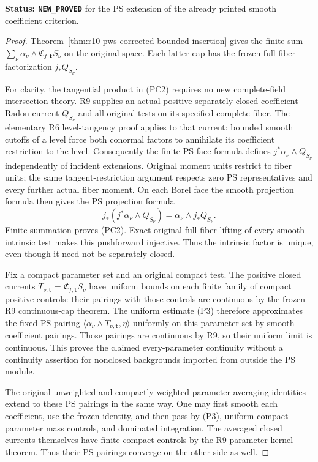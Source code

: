 \noindent\textbf{Status: \texttt{NEW\_PROVED}} for the PS
extension of the already printed smooth coefficient criterion.

\begin{proof}
Theorem~\ref{thm:r10-pws-corrected-bounded-insertion} gives
the finite sum $\sum_\nu\alpha_\nu\wedge
\mathfrak C_{f,\mathbf t}S_\nu$ on the original space.
Each latter cap has the frozen full-fiber factorization
$j_*Q_{S_\nu}$.

For clarity, the tangential product in (PC2) requires no new
complete-field intersection theory.  R9 supplies an actual
positive separately closed coefficient-Radon current $Q_{S_\nu}$
and all original tests on its specified complete fiber.
The elementary R6 level-tangency proof applies to that current:
bounded smooth cutoffs of a level force both conormal factors
to annihilate its coefficient restriction to the level.
Consequently the finite PS face formula defines
$j^*\alpha_\nu\wedge Q_{S_\nu}$ independently of incident
extensions.  Original moment units restrict to fiber units;
the same tangent-restriction argument respects zero PS
representatives and every further actual fiber moment.
On each Borel face the smooth projection formula then gives
the PS projection formula
\[
 j_*(j^*\alpha_\nu\wedge Q_{S_\nu})
                        =\alpha_\nu\wedge j_*Q_{S_\nu}.
\]
Finite summation proves (PC2).  Exact original full-fiber
lifting of every smooth intrinsic test makes this pushforward
injective.  Thus the intrinsic factor is unique, even though
it need not be separately closed.

Fix a compact parameter set and an original compact test.
The positive closed currents
$T_{\nu,\mathbf t}=\mathfrak C_{f,\mathbf t}S_\nu$ have
uniform bounds on each finite family of compact positive
controls: their pairings with those controls are continuous
by the frozen R9 continuous-cap theorem.  The uniform estimate
(P3) therefore approximates the fixed PS pairing
$\langle\alpha_\nu\wedge T_{\nu,\mathbf t},\eta\rangle$
uniformly on this parameter set by smooth coefficient pairings.
Those pairings are continuous by R9, so their uniform limit
is continuous.  This proves the claimed every-parameter
continuity without a continuity assertion for nonclosed
backgrounds imported from outside the PS module.

The original unweighted and compactly weighted parameter
averaging identities extend to these PS pairings in the
same way.  One may first smooth each coefficient, use the
frozen identity, and then pass by (P3), uniform compact
parameter mass controls, and dominated integration.  The
averaged closed currents themselves have finite compact
controls by the R9 parameter-kernel theorem.  Thus their
PS pairings converge on the other side as well.


\end{proof}
